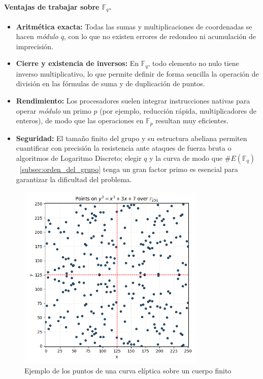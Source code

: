 \paragraph{Ventajas de trabajar sobre \(\mathbb{F}_q\).}
\begin{itemize}
  \item \textbf{Aritmética exacta:} Todas las sumas y multiplicaciones de coordenadas se hacen \emph{módulo \(q\)}, con lo que no existen errores de redondeo ni acumulación de imprecisión.  
  \item \textbf{Cierre y existencia de inversos:} En \(\mathbb{F}_q\), todo elemento no nulo tiene inverso multiplicativo, lo que permite definir de forma sencilla la operación de división en las fórmulas de suma y de duplicación de puntos.  
  \item \textbf{Rendimiento:} Los procesadores suelen integrar instrucciones nativas para operar \emph{módulo} un primo \(p\) (por ejemplo, reducción rápida, multiplicadores de enteros), de modo que las operaciones en \(\mathbb{F}_p\) resultan muy eficientes.  
  \item \textbf{Seguridad:} El tamaño finito del grupo y su estructura abeliana permiten cuantificar con precisión la resistencia ante ataques de fuerza bruta o algoritmos de Logaritmo Discreto; elegir \(q\) y la curva de modo que \(\#E(\mathbb{F}_q)\)~\ref{subsec:orden_del_grupo} tenga un gran factor primo es esencial para garantizar la dificultad del problema.  
\end{itemize}

\begin{figure}[H]
    \centering
    \includegraphics[width=0.8\textwidth]{imagenes/points_finite_field_251.png}
    \caption{Ejemplo de los puntos de una curva elíptica sobre un cuerpo finito}
    \label{fig:points_finite_field_251}
\end{figure}

